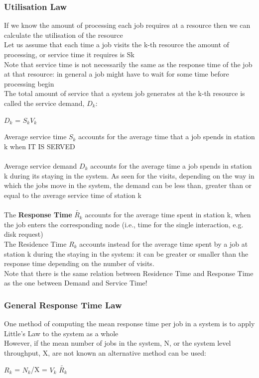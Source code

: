 \documentclass[10pt, oneside]{article}
\begin{document}
\subsubsection{Utilisation Law}If we know the amount of processing each job requires at a resource then we can calculate the utilisation of the resource\\ Let us assume that each time a job visits the k-th resource the amount of processing, or service time it requires is Sk\\ Note that service time is not necessarily the same as the response time of the job at that resource: in general a job might have to wait for some time before processing begin\\ The total amount of service that a system job generates at the k-th resource is called the service demand, $D_k$:
\begin{center}
    $D_k$ = $S_k$$V_k$
\end{center}
Average service time $S_k$ accounts for the average time that a
job spends in station k when IT IS SERVED\\\\ 
Average service demand $D_k$ accounts for the average time a job spends in station k during its staying in the system. As seen for the visits, depending on the way in which the jobs move in the system, the demand can be less than, greater than or equal to the average service time of station k\\\\
The {\bf Response Time} $\widetilde{R_k}$ accounts for the average time spent in station k, when the job enters the corresponding node (i.e., time for the single interaction, e.g. disk request)\\The Residence Time $R_k$ accounts instead for the average time spent by a job at station k during the staying in the system: it can be greater or smaller than the response time depending on the number of visits.\\Note that there is the same relation between Residence Time and Response Time as the one between Demand and Service Time!
\subsubsection{General Response Time Law}One method of computing the mean response time per job in a system is to apply Little's Law to the system as a whole\\ However, if the mean number of jobs in the system, N, or the system level throughput, X, are not known an alternative method can be used:\begin{center}
    $R_k$ = $N_k$/X = $V_k$ $\widetilde{R_k}$
\end{center}
\end{document}
